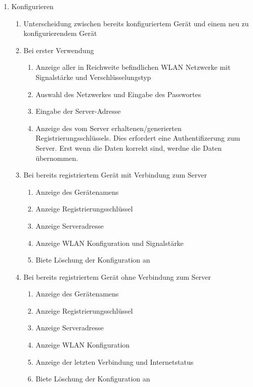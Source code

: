 \documentclass[pointlessnumbers]{scrartcl}
\begin{document}
\begin{enumerate}
  \item Konfigurieren 
  \begin{enumerate}
    \item Unterscheidung zwischen bereits konfiguriertem Gerät und einem neu zu konfigurierendem Gerät 
    \item Bei erster Verwendung 
        \begin{enumerate}
            \item Anzeige aller in Reichweite befindlichen WLAN Netzwerke mit Signalstärke und Verschlüsselungstyp 
            \item Auswahl des Netzwerkes und Eingabe des Passwortes 
            \item Eingabe der Server-Adresse 
            \item Anzeige des vom Server erhaltenen/generierten Registrierungsschlüssels. Dies erfordert eine Authentifizerung zum Server. Erst wenn die Daten korrekt sind, werdne die Daten übernommen.
        \end{enumerate}
    \item Bei bereits registriertem Gerät mit Verbindung zum Server 
        \begin{enumerate}
            \item Anzeige des Gerätenamens 
            \item Anzeige Registrierungsschlüssel 
            \item Anzeige Serveradresse 
            \item Anzeige WLAN Konfiguration und Signalstärke 
            \item Biete Löschung der Konfiguration an 
        \end{enumerate}  
    \item Bei bereits registriertem Gerät ohne Verbindung zum Server
        \begin{enumerate}
            \item Anzeige des Gerätenamens
            \item Anzeige Registrierungsschlüssel 
            \item Anzeige Serveradresse 
            \item Anzeige WLAN Konfiguration 
            \item Anzeige der letzten Verbindung und Internetstatus 
            \item Biete Löschung der Konfiguration an 
        \end{enumerate}        
    \end{enumerate}
        

\end{enumerate}
\end{document}

